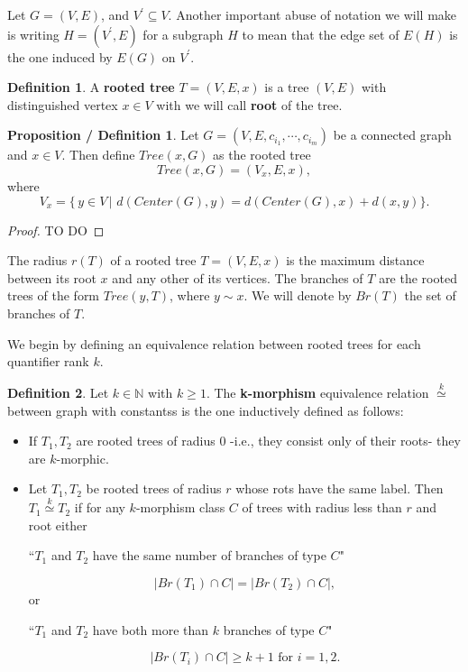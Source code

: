 \documentclass[11pt,notitlepage]{report}
\theoremstyle{definition}
\newtheorem{definition}{Definition}[chapter]
\newtheorem{propdef}{Proposition / Definition}[chapter]
\newcommand{\N}{\mathbb{N}}
\newcommand{\clist}{c_{i_1}, \cdots, c_{i_m}}
\newcommand{\morph}[1]{\stackrel{#1}{\simeq}}
\begin{document}
Let $G=(V,E)$, and $V^\prime\subseteq V$. Another important abuse 
of notation we will make is writing $H=(V^\prime, E)$ 
for a subgraph $H$ to mean that the edge set of $E(H)$ is the one
induced by $E(G)$ on $V^\prime$.

\begin{definition} 
	A \textbf{rooted tree} $T=(V,E,x)$ is a tree 
	$(V,E)$ with distinguished vertex $x\in V$ with we will call 
	\textbf{root} of the tree.
\end{definition}

\begin{propdef}
	Let $G=(V,E,\clist)$ be a connected graph and $x\in V$. 
	Then define $Tree(x,G)$	as the rooted tree
	\[Tree(x,G) = (V_x,E,x),\] where
	\[V_x= \{\, y\in V \, | \,\,d(Center(G),y) = d(Center(G),x) + d(x,y) \}.\]

\end{propdef}
\begin{proof}
	TO DO
\end{proof}



The radius $r(T)$ of a rooted tree $T=(V,E,x)$
is the maximum distance between its root $x$ and any other of
its vertices. The branches of $T$ are the rooted trees of the form
$Tree(y,T)$, where $y\sim x$. We will denote by $Br(T)$ the set of
branches of $T$. \par

We begin by defining an equivalence relation between rooted 
trees for each quantifier rank $k$.

\begin{definition} 
	Let $k\in \N$ with $k\geq 1$. The \textbf{k-morphism} equivalence relation
	$\morph{k}$ between
	graph with constantss is the one inductively defined as follows:
	\begin{itemize}
		\item If $T_1, T_2$ are rooted trees of radius $0$ -i.e., they
		consist only of their roots- they are $k$-morphic. 
		\item Let $T_1, T_2$ be rooted trees of radius $r$ whose 
		rots have the same label. Then $T_1 \morph{k} T_2$ if 
		for any $k$-morphism class $C$ of trees with
		radius less than $r$ and root either
		\begin{center}
			\vspace{-0.2cm}
			``$T_1$ and $T_2$ have the same number of branches of type $C$"
		\end{center}
		\vspace{-0.3cm}
		\[ |Br(T_1)\cap C| = |Br(T_2)\cap C|,\]
		or 
		\begin{center}
			\vspace{-0.2cm}
			``$T_1$ and $T_2$ have both more than $k$ branches of type $C$"
		\end{center}
	\vspace{-0.3cm}
		\[ |Br(T_i)\cap C| \geq k+1 \text{ for } i=1,2. \]
	\end{itemize} 
\end{definition}
\end{document}
